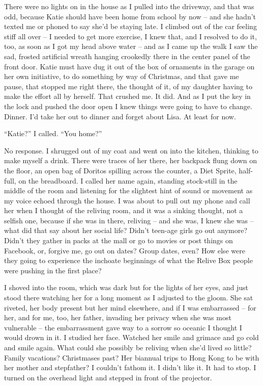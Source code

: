 \documentclass[11pt,a4paper]{article}
\newcommand{\qm}[1]{“#1”}
\begin{document}
There were no lights on in the house as I pulled into the driveway, and that was odd, because Katie should have been home from school by now – and she hadn't texted me or phoned to say she'd be staying late. I climbed out of the car feeling stiff all over – I needed to get more exercise, I knew that, and I resolved to do it, too, as soon as I got my head above water – and as I came up the walk I saw the sad, frosted artificial wreath hanging crookedly there in the center panel of the front door. Katie must have dug it out of the box of ornaments in the garage on her own initiative, to do something by way of Christmas, and that gave me pause, that stopped me right there, the thought of it, of my daughter having to make the effort all by herself. That crushed me. It did. And as I put the key in the lock and pushed the door open I knew things were going to have to change. Dinner. I'd take her out to dinner and forget about Lisa. At least for now.

\qm{Katie?} I called. \qm{You home?}

No response. I shrugged out of my coat and went on into the kitchen, thinking to make myself a drink. There were traces of her there, her backpack flung down on the floor, an open bag of Doritos spilling across the counter, a Diet Sprite, half-full, on the breadboard. I called her name again, standing stock-still in the middle of the room and listening for the slightest hint of sound or movement as my voice echoed through the house. I was about to pull out my phone and call her when I thought of the reliving room, and it was a sinking thought, not a selfish one, because if she was in there, reliving – and she was, I knew she was – what did that say about her social life? Didn't teen-age girls go out anymore? Didn't they gather in packs at the mall or go to movies or post things on Facebook, or, forgive me, go out on dates? Group dates, even? How else were they going to experience the inchoate beginnings of what the Relive Box people were pushing in the first place?

I shoved into the room, which was dark but for the lights of her eyes, and just stood there watching her for a long moment as I adjusted to the gloom. She sat riveted, her body present but her mind elsewhere, and if I was embarrassed – for her, and for me, too, her father, invading her privacy when she was most vulnerable – the embarrassment gave way to a sorrow so oceanic I thought I would drown in it. I studied her face. Watched her smile and grimace and go cold and smile again. What could she possibly be reliving when she'd lived so little? Family vacations? Christmases past? Her biannual trips to Hong Kong to be with her mother and stepfather? I couldn't fathom it. I didn't like it. It had to stop. I turned on the overhead light and stepped in front of the projector.
\end{document}
